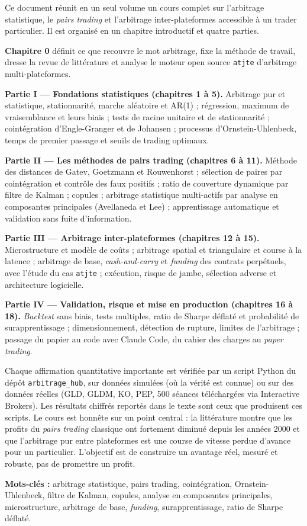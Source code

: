 \noindent Ce document réunit en un seul volume un cours complet sur l'arbitrage statistique, le \emph{pairs trading} et l'arbitrage inter-plateformes accessible à un trader particulier. Il est organisé en un chapitre introductif et quatre parties.

\medskip\noindent\textbf{Chapitre 0} définit ce que recouvre le mot \og arbitrage\fg, fixe la méthode de travail, dresse la revue de littérature et analyse le moteur open source \texttt{atjte} d'arbitrage multi-plateformes.

\medskip\noindent\textbf{Partie I — Fondations statistiques (chapitres 1 à 5).} Arbitrage pur et statistique, stationnarité, marche aléatoire et AR(1) ; régression, maximum de vraisemblance et leurs biais ; tests de racine unitaire et de stationnarité ; cointégration d'Engle-Granger et de Johansen ; processus d'Ornstein-Uhlenbeck, temps de premier passage et seuils de trading optimaux.

\medskip\noindent\textbf{Partie II — Les méthodes de pairs trading (chapitres 6 à 11).} Méthode des distances de Gatev, Goetzmann et Rouwenhorst ; sélection de paires par cointégration et contrôle des faux positifs ; ratio de couverture dynamique par filtre de Kalman ; copules ; arbitrage statistique multi-actifs par analyse en composantes principales (Avellaneda et Lee) ; apprentissage automatique et validation sans fuite d'information.

\medskip\noindent\textbf{Partie III — Arbitrage inter-plateformes (chapitres 12 à 15).} Microstructure et modèle de coûts ; arbitrage spatial et triangulaire et course à la latence ; arbitrage de base, \emph{cash-and-carry} et \emph{funding} des contrats perpétuels, avec l'étude du cas \texttt{atjte} ; exécution, risque de jambe, sélection adverse et architecture logicielle.

\medskip\noindent\textbf{Partie IV — Validation, risque et mise en production (chapitres 16 à 18).} \emph{Backtest} sans biais, tests multiples, ratio de Sharpe déflaté et probabilité de surapprentissage ; dimensionnement, détection de rupture, limites de l'arbitrage ; passage du papier au code avec Claude Code, du cahier des charges au \emph{paper trading}.

\medskip\noindent Chaque affirmation quantitative importante est vérifiée par un script Python du dépôt \texttt{arbitrage\_hub}, sur données simulées (où la vérité est connue) ou sur des données réelles (GLD, GLDM, KO, PEP, 500 séances téléchargées via Interactive Brokers). Les résultats chiffrés reportés dans le texte sont ceux que produisent ces scripts. Le cours est honnête sur un point central : la littérature montre que les profits du \emph{pairs trading} classique ont fortement diminué depuis les années 2000 et que l'arbitrage \og pur\fg{} entre plateformes est une course de vitesse perdue d'avance pour un particulier. L'objectif est de construire un avantage réel, mesuré et robuste, pas de promettre un profit.

\medskip\noindent\textbf{Mots-clés :} arbitrage statistique, pairs trading, cointégration, Ornstein-Uhlenbeck, filtre de Kalman, copules, analyse en composantes principales, microstructure, arbitrage de base, \emph{funding}, surapprentissage, ratio de Sharpe déflaté.
